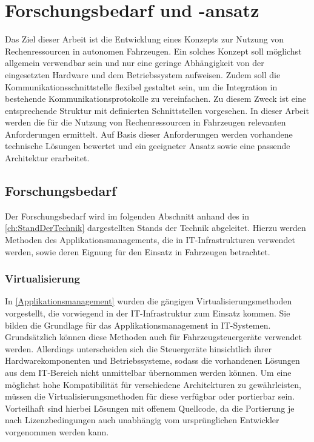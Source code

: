 \chapter{Forschungsbedarf und -ansatz}

Das Ziel dieser Arbeit ist die Entwicklung eines Konzepts zur Nutzung von Rechenressourcen in autonomen Fahrzeugen. Ein solches Konzept soll möglichst allgemein verwendbar sein und nur eine geringe Abhängigkeit von der eingesetzten Hardware und dem Betriebssystem aufweisen. Zudem soll die Kommunikationsschnittstelle flexibel gestaltet sein, um die Integration in bestehende Kommunikationsprotokolle zu vereinfachen. Zu diesem Zweck ist eine entsprechende Struktur mit definierten Schnittstellen vorgesehen. In dieser Arbeit werden die für die Nutzung von Rechenressourcen in Fahrzeugen relevanten Anforderungen ermittelt. Auf Basis dieser Anforderungen werden vorhandene technische Lösungen bewertet und ein geeigneter Ansatz sowie eine passende Architektur erarbeitet.

\section{Forschungsbedarf}

Der Forschungsbedarf wird im folgenden Abschnitt anhand des in \autoref{ch:StandDerTechnik} dargestellten Stands der Technik abgeleitet. Hierzu werden Methoden des Applikationsmanagements, die in IT-Infrastrukturen verwendet werden, sowie deren Eignung für den Einsatz in Fahrzeugen betrachtet.

\subsection{Virtualisierung}
\label{Virtualisierung}
In \autoref{Applikationsmanagement} wurden die gängigen Virtualisierungsmethoden vorgestellt, die vorwiegend in der IT-Infrastruktur zum Einsatz kommen. Sie bilden die Grundlage für das Applikationsmanagement in IT-Systemen. Grundsätzlich können diese Methoden auch für Fahrzeugsteuergeräte verwendet werden. Allerdings unterscheiden sich die Steuergeräte hinsichtlich ihrer Hardwarekomponenten und Betriebssysteme, sodass die vorhandenen Lösungen aus dem IT-Bereich nicht unmittelbar übernommen werden können. Um eine möglichst hohe Kompatibilität für verschiedene Architekturen zu gewährleisten, müssen die Virtualisierungsmethoden für diese verfügbar oder portierbar sein. Vorteilhaft sind hierbei Lösungen mit offenem Quellcode, da die Portierung je nach Lizenzbedingungen auch unabhängig vom ursprünglichen Entwickler vorgenommen werden kann. 

